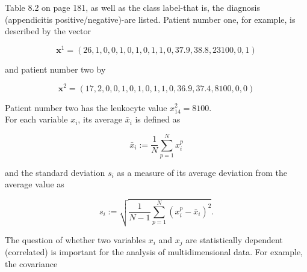 \documentclass[10pt]{article}
\begin{document}
Table 8.2 on page 181, as well as the class label-that is, the diagnosis (appendicitis positive/negative)-are listed. Patient number one, for example, is described by the vector

$$
\boldsymbol{x}^{1}=(26,1,0,0,1,0,1,0,1,1,0,37.9,38.8,23100,0,1)
$$

and patient number two by

$$
\boldsymbol{x}^{2}=(17,2,0,0,1,0,1,0,1,1,0,36.9,37.4,8100,0,0)
$$

Patient number two has the leukocyte value $x_{14}^{2}=8100$.\\
For each variable $x_{i}$, its average $\bar{x}_{i}$ is defined as

$$
\bar{x}_{i}:=\frac{1}{N} \sum_{p=1}^{N} x_{i}^{p}
$$

and the standard deviation $s_{i}$ as a measure of its average deviation from the average value as

$$
s_{i}:=\sqrt{\frac{1}{N-1} \sum_{p=1}^{N}\left(x_{i}^{p}-\bar{x}_{i}\right)^{2}} .
$$

The question of whether two variables $x_{i}$ and $x_{j}$ are statistically dependent (correlated) is important for the analysis of multidimensional data. For example, the covariance
\end{document}
